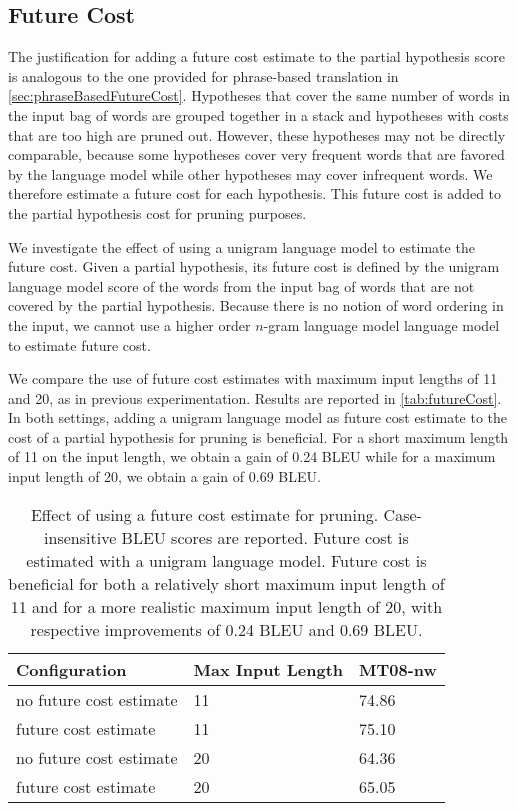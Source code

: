 \subsection{Future Cost}
\label{sec:gyroFutureCost}

The justification for adding a future cost estimate to the partial
hypothesis score is analogous to the one provided for phrase-based
translation in \autoref{sec:phraseBasedFutureCost}.
Hypotheses that
cover the same number of words in the input
bag of words are grouped together in a stack and
hypotheses with costs that are too high are pruned out.
However, these hypotheses may not be directly comparable, because
some hypotheses cover very frequent words that are favored by the
language model while other hypotheses may cover infrequent words.
We therefore estimate a future cost for each hypothesis.
This future cost is added to the partial hypothesis cost for pruning
purposes.

We investigate the effect of using a unigram language model to estimate
the future cost. Given a partial hypothesis, its future cost is defined
by the unigram language model score of the words from the input
bag of words that are not covered by the partial hypothesis.
Because there is no notion of word ordering in the input, we
cannot use a higher order $n$-gram language model
language model to estimate future cost.

We compare the use of future cost estimates with maximum input lengths
of 11 and 20, as in previous experimentation. Results are reported in \autoref{tab:futureCost}.
In both settings, adding a unigram language model as
future cost estimate to the cost of a partial hypothesis for pruning is beneficial.
For a short maximum length of 11 on the input length, we
obtain a gain of 0.24 BLEU while for a maximum input length
of 20, we obtain a gain of 0.69 BLEU.
%
\begin{table}
  \begin{center}
    \begin{tabular}{l|l|l}
      Configuration & Max Input Length & MT08-nw \\
      \hline
      no future cost estimate & 11 & 74.86 \\
      future cost estimate & 11 & 75.10 \\
      \hline
      no future cost estimate & 20 & 64.36 \\
      future cost estimate & 20 & 65.05 \\
    \end{tabular}
    \caption{Effect of using a future cost estimate for pruning.
      Case-insensitive BLEU scores are reported.
      Future cost is estimated with a unigram language model.
      Future cost is beneficial for both a relatively short maximum input
      length of 11 and for a more realistic maximum input length of 20, with
      respective improvements of 0.24 BLEU and 0.69 BLEU.}
    \label{tab:futureCost}
  \end{center}
\end{table}

